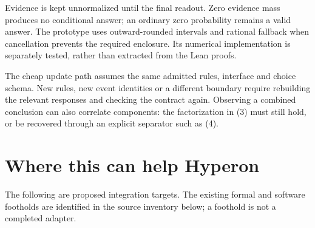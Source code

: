 \documentclass[11pt,a4paper]{article}
\begin{document}
Evidence is kept unnormalized until the final readout. Zero evidence mass
produces no conditional answer; an ordinary zero probability remains a valid
answer. The prototype uses outward-rounded intervals and rational fallback
when cancellation prevents the required enclosure. Its numerical implementation
is separately tested, rather than extracted from the Lean proofs.

The cheap update path assumes the same admitted rules, interface and choice
schema. New rules, new event identities or a different boundary require
rebuilding the relevant responses and checking the contract again. Observing
a combined conclusion can also correlate components: the factorization in
(3) must still hold, or be recovered through an explicit separator such as (4).

\section{Where this can help Hyperon}

The following are proposed integration targets. The existing formal and
software footholds are identified in the source inventory below; a foothold
is not a completed adapter.
\end{document}
